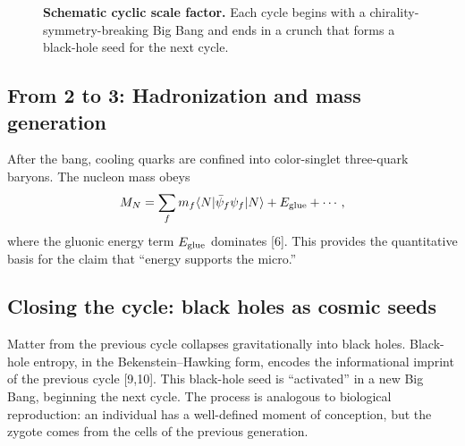 \documentclass[11pt,a4paper]{article}
\begin{document}
\begin{figure}[htbp]
\centering
{}
\caption{\textbf{Schematic cyclic scale factor.} Each cycle begins with a chirality-symmetry-breaking Big Bang and ends in a crunch that forms a black-hole seed for the next cycle.}
\label{fig:scalefactor}
\end{figure}

\subsection{From 2 to 3: Hadronization and mass generation}
After the bang, cooling quarks are confined into color-singlet three-quark baryons. The nucleon mass obeys
\begin{equation}
M_N=\sum_f m_f\langle N|\bar\psi_f\psi_f|N\rangle+E_{\rm glue}+\cdots,
\end{equation}
where the gluonic energy term $E_{\rm glue}$ dominates [6]. This provides the quantitative basis for the claim that ``energy supports the micro.''

\subsection{Closing the cycle: black holes as cosmic seeds}
Matter from the previous cycle collapses gravitationally into black holes. Black-hole entropy, in the Bekenstein--Hawking form, encodes the informational imprint of the previous cycle [9,10]. This black-hole seed is ``activated'' in a new Big Bang, beginning the next cycle. The process is analogous to biological reproduction: an individual has a well-defined moment of conception, but the zygote comes from the cells of the previous generation.
\end{document}
